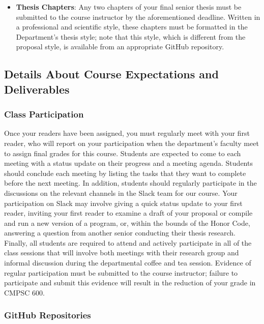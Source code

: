 \documentclass[11pt]{article}
\begin{document}
\begin{itemize}
  \item {\bf Thesis Chapters}: Any two chapters of your final senior thesis must
    be submitted to the course instructor by the aforementioned deadline.
    Written in a professional and scientific style, these chapters must be
    formatted in the Department's thesis style; note that this style, which is
    different from the proposal style, is available from an appropriate GitHub
    repository.

\end{itemize}

\subsection*{Details About Course Expectations and Deliverables}

\subsubsection*{Class Participation}

Once your readers have been assigned, you must regularly meet with your first
reader, who will report on your participation when the department's faculty meet
to assign final grades for this course. Students are expected to come to each
meeting with a status update on their progress and a meeting agenda. Students
should conclude each meeting by listing the tasks that they want to complete
before the next meeting. In addition, students should regularly participate in
the discussions on the relevant channels in the Slack team for our course. Your
participation on Slack may involve giving a quick status update to your first
reader, inviting your first reader to examine a draft of your proposal or
compile and run a new version of a program, or, within the bounds of the Honor
Code, answering a question from another senior conducting their thesis research.
Finally, all students are required to attend and actively participate in all of
the class sessions that will involve both meetings with their research group and
informal discussion during the departmental coffee and tea session. Evidence of
regular participation must be submitted to the course instructor; failure to
participate and submit this evidence will result in the reduction of your grade
in CMPSC 600.

\subsubsection*{GitHub Repositories}
\end{document}

